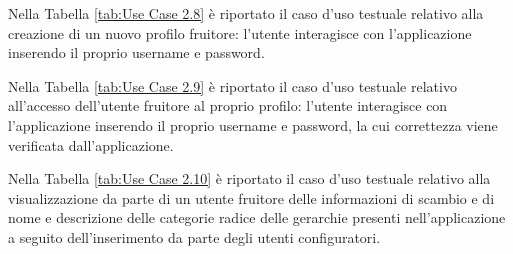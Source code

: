 Nella Tabella \ref{tab:Use Case 2.8} è riportato il caso d'uso testuale relativo alla creazione di un nuovo profilo fruitore: l'utente interagisce con l'applicazione inserendo il proprio username e password.\bigskip

Nella Tabella \ref{tab:Use Case 2.9} è riportato il caso d'uso testuale relativo all'accesso dell'utente fruitore al proprio profilo: l'utente interagisce con l'applicazione inserendo il proprio username e password, la cui correttezza viene verificata dall'applicazione.\bigskip

Nella Tabella \ref{tab:Use Case 2.10} è riportato il caso d'uso testuale relativo alla visualizzazione da parte di un utente fruitore delle informazioni di scambio e di nome e descrizione delle categorie radice delle gerarchie presenti nell'applicazione a seguito dell'inserimento da parte degli utenti configuratori.\bigskip

